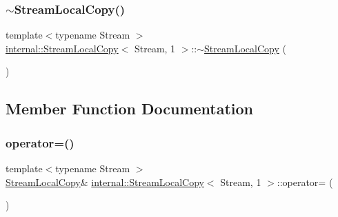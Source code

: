 \mbox{\label{classinternal_1_1StreamLocalCopy_3_01Stream_00_011_01_4_ac13d9994e6c828536fedf698f5824687}} 
\subsubsection{\texorpdfstring{$\sim$\+Stream\+Local\+Copy()}{~StreamLocalCopy()}}
{\footnotesize\ttfamily template$<$typename Stream $>$ \\
\hyperlink{classinternal_1_1StreamLocalCopy}{internal\+::\+Stream\+Local\+Copy}$<$ Stream, 1 $>$\+::$\sim$\hyperlink{classinternal_1_1StreamLocalCopy}{Stream\+Local\+Copy} (\begin{DoxyParamCaption}{ }\end{DoxyParamCaption})\hspace{0.3cm}{\ttfamily [inline]}}



\subsection{Member Function Documentation}
\mbox{\label{classinternal_1_1StreamLocalCopy_3_01Stream_00_011_01_4_ac2b9afa416fa4fc2a37156445902bfc3}} 
\subsubsection{\texorpdfstring{operator=()}{operator=()}}
{\footnotesize\ttfamily template$<$typename Stream $>$ \\
\hyperlink{classinternal_1_1StreamLocalCopy}{Stream\+Local\+Copy}\& \hyperlink{classinternal_1_1StreamLocalCopy}{internal\+::\+Stream\+Local\+Copy}$<$ Stream, 1 $>$\+::operator= (\begin{DoxyParamCaption}\item[{const \hyperlink{classinternal_1_1StreamLocalCopy}{Stream\+Local\+Copy}$<$ Stream, 1 $>$ \&}]{ }\end{DoxyParamCaption})\hspace{0.3cm}{\ttfamily [private]}}



